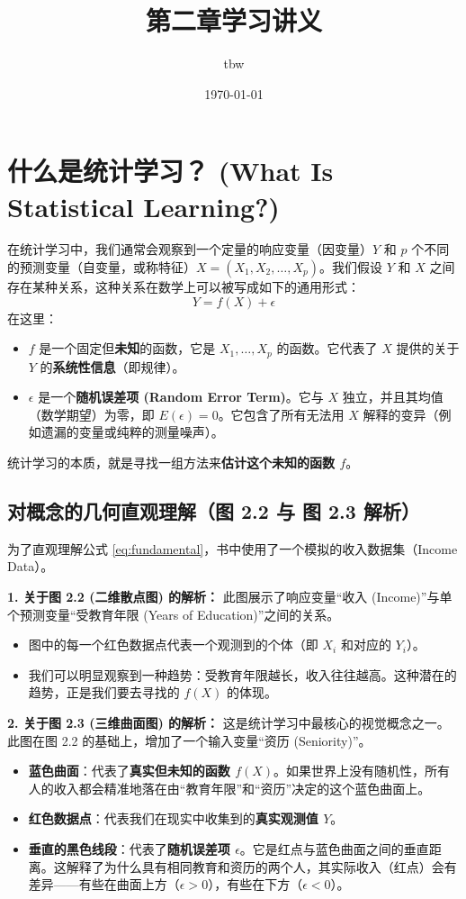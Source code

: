 \documentclass[UTF8]{ctexart}
\title{第二章学习讲义 }
\author{tbw}
\date{\today}
\numberwithin{equation}{section}
\begin{document}
\maketitle

\section{什么是统计学习？ (What Is Statistical Learning?)}

在统计学习中，我们通常会观察到一个定量的响应变量（因变量）$Y$ 和 $p$ 个不同的预测变量（自变量，或称特征）$X = (X_1, X_2, \dots, X_p)$。我们假设 $Y$ 和 $X$ 之间存在某种关系，这种关系在数学上可以被写成如下的通用形式：
\begin{equation}
Y = f(X) + \epsilon
\label{eq:fundamental}
\end{equation}
在这里：
\begin{itemize}
    \item $f$ 是一个固定但\textbf{未知}的函数，它是 $X_1, \dots, X_p$ 的函数。它代表了 $X$ 提供的关于 $Y$ 的\textbf{系统性信息}（即规律）。
    \item $\epsilon$ 是一个\textbf{随机误差项 (Random Error Term)}。它与 $X$ 独立，并且其均值（数学期望）为零，即 $E(\epsilon) = 0$。它包含了所有无法用 $X$ 解释的变异（例如遗漏的变量或纯粹的测量噪声）。
\end{itemize}

统计学习的本质，就是寻找一组方法来\textbf{估计这个未知的函数 $f$}。

\subsection{对概念的几何直观理解（图 2.2 与 图 2.3 解析）}

为了直观理解公式 \eqref{eq:fundamental}，书中使用了一个模拟的收入数据集（Income Data）。

\textbf{1. 关于图 2.2 (二维散点图) 的解析：}
此图展示了响应变量“收入 (Income)”与单个预测变量“受教育年限 (Years of Education)”之间的关系。
\begin{itemize}
    \item 图中的每一个红色数据点代表一个观测到的个体（即 $X_i$ 和对应的 $Y_i$）。
    \item 我们可以明显观察到一种趋势：受教育年限越长，收入往往越高。这种潜在的趋势，正是我们要去寻找的 $f(X)$ 的体现。
\end{itemize}

\textbf{2. 关于图 2.3 (三维曲面图) 的解析：}
这是统计学习中最核心的视觉概念之一。此图在图 2.2 的基础上，增加了一个输入变量“资历 (Seniority)”。
\begin{itemize}
    \item \textbf{蓝色曲面}：代表了\textbf{真实但未知的函数 $f(X)$}。如果世界上没有随机性，所有人的收入都会精准地落在由“教育年限”和“资历”决定的这个蓝色曲面上。
    \item \textbf{红色数据点}：代表我们在现实中收集到的\textbf{真实观测值 $Y$}。
    \item \textbf{垂直的黑色线段}：代表了\textbf{随机误差项 $\epsilon$}。它是红点与蓝色曲面之间的垂直距离。这解释了为什么具有相同教育和资历的两个人，其实际收入（红点）会有差异——有些在曲面上方（$\epsilon > 0$），有些在下方（$\epsilon < 0$）。
\end{itemize}
\end{document}
